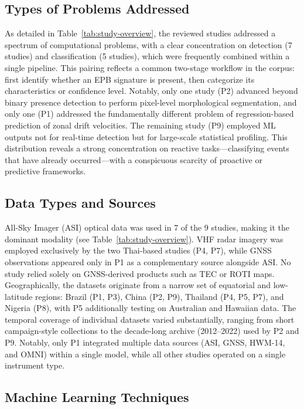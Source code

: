 \subsection{Types of Problems Addressed}\label{subsec:types-of-problems-addressed}

As detailed in Table~\ref{tab:study-overview}, the reviewed studies addressed a spectrum of computational problems, with a clear concentration on detection (7 studies) and classification (5 studies), which were frequently combined within a single pipeline. This pairing reflects a common two-stage workflow in the corpus: first identify whether an EPB signature is present, then categorize its characteristics or confidence level. Notably, only one study (P2) advanced beyond binary presence detection to perform pixel-level morphological segmentation, and only one (P1) addressed the fundamentally different problem of regression-based prediction of zonal drift velocities. The remaining study (P9) employed ML outputs not for real-time detection but for large-scale statistical profiling. This distribution reveals a strong concentration on reactive tasks---classifying events that have already occurred---with a conspicuous scarcity of proactive or predictive frameworks.

\subsection{Data Types and Sources}\label{subsec:data-types-and-sources}

All-Sky Imager (ASI) optical data was used in 7 of the 9 studies, making it the dominant modality (see Table~\ref{tab:study-overview}). VHF radar imagery was employed exclusively by the two Thai-based studies (P4, P7), while GNSS observations appeared only in P1 as a complementary source alongside ASI. No study relied solely on GNSS-derived products such as TEC or ROTI maps. Geographically, the datasets originate from a narrow set of equatorial and low-latitude regions: Brazil (P1, P3), China (P2, P9), Thailand (P4, P5, P7), and Nigeria (P8), with P5 additionally testing on Australian and Hawaiian data. The temporal coverage of individual datasets varied substantially, ranging from short campaign-style collections to the decade-long archive (2012--2022) used by P2 and P9. Notably, only P1 integrated multiple data sources (ASI, GNSS, HWM-14, and OMNI) within a single model, while all other studies operated on a single instrument type.

\subsection{Machine Learning Techniques}\label{subsec:machine-learning-techniques}

